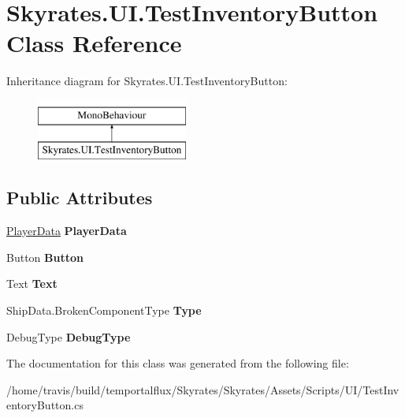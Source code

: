 \hypertarget{class_skyrates_1_1_u_i_1_1_test_inventory_button}{\section{Skyrates.\-U\-I.\-Test\-Inventory\-Button Class Reference}
\label{class_skyrates_1_1_u_i_1_1_test_inventory_button}
}
Inheritance diagram for Skyrates.\-U\-I.\-Test\-Inventory\-Button\-:\begin{figure}[H]
\begin{center}
\leavevmode
\includegraphics[height=2.000000cm]{class_skyrates_1_1_u_i_1_1_test_inventory_button}
\end{center}
\end{figure}
\subsection*{Public Attributes}
\begin{DoxyCompactItemize}
\item 
\hypertarget{class_skyrates_1_1_u_i_1_1_test_inventory_button_afc641812e362db7dc10fc7758397a55a}{\hyperlink{class_skyrates_1_1_data_1_1_player_data}{Player\-Data} {\bfseries Player\-Data}}\label{class_skyrates_1_1_u_i_1_1_test_inventory_button_afc641812e362db7dc10fc7758397a55a}

\item 
\hypertarget{class_skyrates_1_1_u_i_1_1_test_inventory_button_a71babaa36b7f5b63c006241b4f209259}{Button {\bfseries Button}}\label{class_skyrates_1_1_u_i_1_1_test_inventory_button_a71babaa36b7f5b63c006241b4f209259}

\item 
\hypertarget{class_skyrates_1_1_u_i_1_1_test_inventory_button_aa44459b84ea5b7e4dc0e0189e2b74f10}{Text {\bfseries Text}}\label{class_skyrates_1_1_u_i_1_1_test_inventory_button_aa44459b84ea5b7e4dc0e0189e2b74f10}

\item 
\hypertarget{class_skyrates_1_1_u_i_1_1_test_inventory_button_a457a716e96185312f390b30c1423da8b}{Ship\-Data.\-Broken\-Component\-Type {\bfseries Type}}\label{class_skyrates_1_1_u_i_1_1_test_inventory_button_a457a716e96185312f390b30c1423da8b}

\item 
\hypertarget{class_skyrates_1_1_u_i_1_1_test_inventory_button_ab9ef6d69cefb670719ad424fcfd3f1bd}{Debug\-Type {\bfseries Debug\-Type}}\label{class_skyrates_1_1_u_i_1_1_test_inventory_button_ab9ef6d69cefb670719ad424fcfd3f1bd}

\end{DoxyCompactItemize}


The documentation for this class was generated from the following file\-:\begin{DoxyCompactItemize}
\item 
/home/travis/build/temportalflux/\-Skyrates/\-Skyrates/\-Assets/\-Scripts/\-U\-I/Test\-Inventory\-Button.\-cs\end{DoxyCompactItemize}
